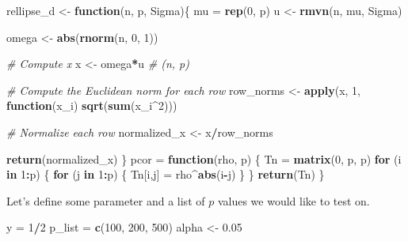 \documentclass[
]{article}
\newenvironment{Shaded}{\begin{snugshade}}{\end{snugshade}}
\newcommand{\CommentTok}[1]{\textcolor[rgb]{0.56,0.35,0.01}{\textit{#1}}}
\newcommand{\ControlFlowTok}[1]{\textcolor[rgb]{0.13,0.29,0.53}{\textbf{#1}}}
\newcommand{\DecValTok}[1]{\textcolor[rgb]{0.00,0.00,0.81}{#1}}
\newcommand{\FloatTok}[1]{\textcolor[rgb]{0.00,0.00,0.81}{#1}}
\newcommand{\FunctionTok}[1]{\textcolor[rgb]{0.13,0.29,0.53}{\textbf{#1}}}
\newcommand{\NormalTok}[1]{#1}
\newcommand{\OtherTok}[1]{\textcolor[rgb]{0.56,0.35,0.01}{#1}}
\newcommand{\SpecialCharTok}[1]{\textcolor[rgb]{0.81,0.36,0.00}{\textbf{#1}}}
\begin{document}
\begin{Shaded}
\begin{Highlighting}[]
\NormalTok{rellipse\_d }\OtherTok{\textless{}{-}} \ControlFlowTok{function}\NormalTok{(n, p, Sigma)\{}
\NormalTok{  mu }\OtherTok{=} \FunctionTok{rep}\NormalTok{(}\DecValTok{0}\NormalTok{, p)}
\NormalTok{  u }\OtherTok{\textless{}{-}} \FunctionTok{rmvn}\NormalTok{(n, mu, Sigma)}
  
\NormalTok{  omega }\OtherTok{\textless{}{-}} \FunctionTok{abs}\NormalTok{(}\FunctionTok{rnorm}\NormalTok{(n, }\DecValTok{0}\NormalTok{, }\DecValTok{1}\NormalTok{))}

  \CommentTok{\# Compute x}
\NormalTok{  x }\OtherTok{\textless{}{-}}\NormalTok{ omega}\SpecialCharTok{*}\NormalTok{u }\CommentTok{\# (n, p)}
  
  \CommentTok{\# Compute the Euclidean norm for each row}
\NormalTok{  row\_norms }\OtherTok{\textless{}{-}} \FunctionTok{apply}\NormalTok{(x, }\DecValTok{1}\NormalTok{, }\ControlFlowTok{function}\NormalTok{(x\_i) }\FunctionTok{sqrt}\NormalTok{(}\FunctionTok{sum}\NormalTok{(x\_i}\SpecialCharTok{\^{}}\DecValTok{2}\NormalTok{)))}

  \CommentTok{\# Normalize each row}
\NormalTok{  normalized\_x }\OtherTok{\textless{}{-}}\NormalTok{ x}\SpecialCharTok{/}\NormalTok{row\_norms}
  
  \FunctionTok{return}\NormalTok{(normalized\_x)}
\NormalTok{\}}
\NormalTok{pcor }\OtherTok{=} \ControlFlowTok{function}\NormalTok{(rho, p) \{}
\NormalTok{  Tn }\OtherTok{=} \FunctionTok{matrix}\NormalTok{(}\DecValTok{0}\NormalTok{, p, p)}
  \ControlFlowTok{for}\NormalTok{ (i }\ControlFlowTok{in} \DecValTok{1}\SpecialCharTok{:}\NormalTok{p) \{}
    \ControlFlowTok{for}\NormalTok{ (j }\ControlFlowTok{in} \DecValTok{1}\SpecialCharTok{:}\NormalTok{p) \{}
\NormalTok{      Tn[i,j] }\OtherTok{=}\NormalTok{ rho}\SpecialCharTok{\^{}}\FunctionTok{abs}\NormalTok{(i}\SpecialCharTok{{-}}\NormalTok{j)}
\NormalTok{    \}}
\NormalTok{  \}}
  \FunctionTok{return}\NormalTok{(Tn)}
\NormalTok{\}}
\end{Highlighting}
\end{Shaded}

Let's define some parameter and a list of \(p\) values we would like to
test on.

\begin{Shaded}
\begin{Highlighting}[]
\NormalTok{y }\OtherTok{=} \DecValTok{1}\SpecialCharTok{/}\DecValTok{2}
\NormalTok{p\_list }\OtherTok{=} \FunctionTok{c}\NormalTok{(}\DecValTok{100}\NormalTok{, }\DecValTok{200}\NormalTok{, }\DecValTok{500}\NormalTok{)}
\NormalTok{alpha }\OtherTok{\textless{}{-}} \FloatTok{0.05}
\end{Highlighting}
\end{Shaded}
\end{document}
